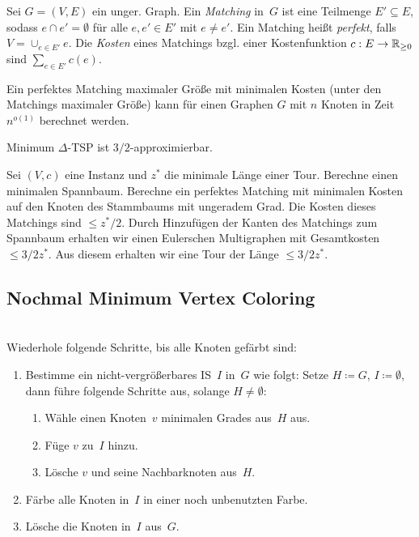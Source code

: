 \documentclass{cheat-sheet}
\newcommand{\Algorithm}[1]{\textcolor{AlgorithmColor}{\textbf{#1}}}
\begin{document}
\begin{defn}
  Sei $G = (V, E)$ ein unger. Graph.
  Ein \emph{Matching} in~$G$ ist eine Teilmenge $E' \subseteq E$, sodass $e \cap e' = \emptyset$ für alle $e, e' \in E'$ mit $e \neq e'$.
  Ein Matching heißt \emph{perfekt}, falls $V = \cup_{e \in E'} e$.
  Die \textit{Kosten} eines Matchings bzgl. einer Kostenfunktion $c : E \to \mathbb{R}_{\geq 0}$ sind ${\sum}_{e \in E'} c(e)$.
\end{defn}

\begin{satz}
  Ein perfektes Matching maximaler Größe mit minimalen Kosten (unter den Matchings maximaler Größe) kann für einen Graphen $G$ mit $n$ Knoten in Zeit $n^{o(1)}$ berechnet werden.
\end{satz}

\begin{satz}
  Minimum $\Delta$-TSP ist $3/2$-approximierbar.
\end{satz}

\begin{beweisskizze}
  Sei $(V, c)$ eine Instanz und $z^*$ die minimale Länge einer Tour.
  Berechne einen minimalen Spannbaum.
  Berechne ein perfektes Matching mit minimalen Kosten auf den Knoten des Stammbaums mit ungeradem Grad.
  Die Kosten dieses Matchings sind $\leq z^* / 2$.
  Durch Hinzufügen der Kanten des Matchings zum Spannbaum erhalten wir einen Eulerschen Multigraphen mit Gesamtkosten $\leq 3/2 z^*$.
  Aus diesem erhalten wir eine Tour der Länge $\leq 3/2 z^*$.
\end{beweisskizze}

\subsection{Nochmal Minimum Vertex Coloring}

\begin{alg}[\Algorithm{Greedy Vertex Coloring}] \mbox{}\\
  Wiederhole folgende Schritte, bis alle Knoten gefärbt sind:
  \begin{enumerate}
    \item
      Bestimme ein nicht-vergrößerbares IS~$I$ in~$G$ wie folgt: Setze $H \coloneqq G$, $I \coloneqq \emptyset$, dann führe folgende Schritte aus, solange $H \neq \emptyset$:
      \begin{enumerate}
        \item Wähle einen Knoten~$v$ minimalen Grades aus~$H$ aus.
        \item Füge $v$ zu~$I$ hinzu.
        \item Lösche $v$ und seine Nachbarknoten aus~$H$.
      \end{enumerate}
    \item Färbe alle Knoten in~$I$ in einer noch unbenutzten Farbe.
    \item Lösche die Knoten in~$I$ aus~$G$.
  \end{enumerate}
\end{alg}
\end{document}
